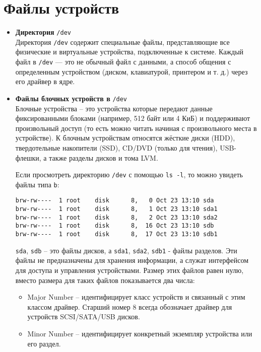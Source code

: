\documentclass[10pt]{article}
\begin{document}
\section*{Файлы устройств}
\begin{itemize}
\item \textbf{Директория }\texttt{/dev}\\
Директория \texttt{/dev} содержит специальные файлы, представляющие все физические и виртуальные устройства, подключенные к системе. Каждый файл в \texttt{/dev} — это не обычный файл с данными, а способ общения с определенным устройством (диском, клавиатурой, принтером и т. д.) через его драйвер в ядре.

\item \textbf{Файлы блочных устройств в }\texttt{/dev}\\
Блочные устройства -- это устройства которые передают данные фиксированными блоками (например, 512 байт или 4 КиБ) и поддерживают произвольный доступ (то есть можно читать начиная с произвольного места в устройстве). К блочным устройствам относятся жёсткие диски (HDD), твердотельные накопители (SSD), CD/DVD (только для чтения), USB-флешки, а также разделы дисков и тома LVM.

Если просмотреть директорию \texttt{/dev} с помощью \texttt{ls -l}, то можно увидеть файлы типа \texttt{b}:
\begin{lstlisting}
brw-rw----  1 root    disk      8,   0 Oct 23 13:10 sda
brw-rw----  1 root    disk      8,   1 Oct 23 13:10 sda1
brw-rw----  1 root    disk      8,   2 Oct 23 13:10 sda2
brw-rw----  1 root    disk      8,  16 Oct 23 13:10 sdb
brw-rw----  1 root    disk      8,  17 Oct 23 13:10 sdb1
\end{lstlisting}
\texttt{sda}, \texttt{sdb} -- это файлы дисков, а \texttt{sda1}, \texttt{sda2}, \texttt{sdb1} - файлы разделов.
Эти файлы не предназначены для хранения информации, а служат интерфейсом для доступа и управления устройствами. Размер этих файлов равен нулю, вместо размера для таких файлов показывается два числа:
\begin{itemize}
\item Major Number -- идентифицирует класс устройств и связанный с этим классом драйвер. Старший номер 8 всегда обозначает драйвер для устройств SCSI/SATA/USB дисков.
\item Minor Number -- идентифицирует конкретный экземпляр устройства или его раздел.
\end{itemize}


\end{itemize}
\end{document}
